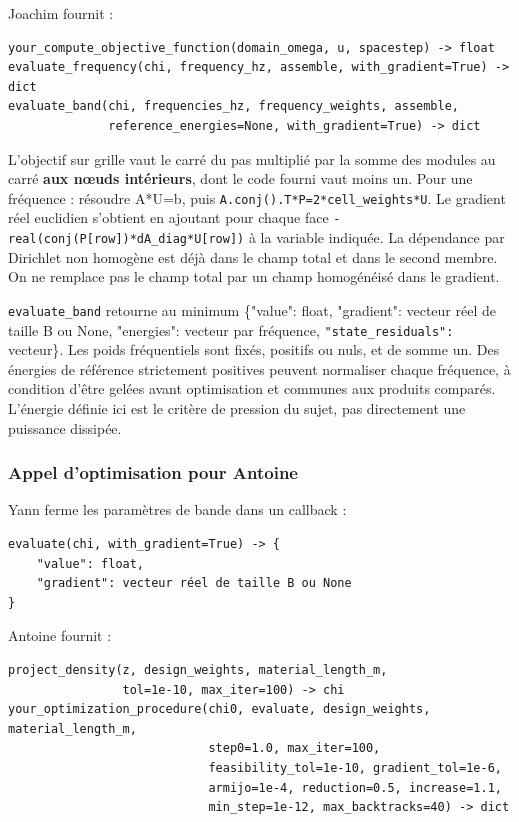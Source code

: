 \documentclass[11pt,a4paper]{article}
\begin{document}
Joachim fournit :

\begin{Verbatim}[breaklines,breakanywhere,fontsize=\footnotesize]
your_compute_objective_function(domain_omega, u, spacestep) -> float
evaluate_frequency(chi, frequency_hz, assemble, with_gradient=True) -> dict
evaluate_band(chi, frequencies_hz, frequency_weights, assemble,
              reference_energies=None, with_gradient=True) -> dict
\end{Verbatim}

L'objectif sur grille vaut le carré du pas multiplié par la somme des modules au carré \textbf{aux nœuds intérieurs}, dont le code fourni vaut moins un. Pour une fréquence : résoudre {\small\ttfamily A*U=b}, puis {\small\ttfamily \nolinkurl{A.conj().T*P=2*cell_weights*U}}. Le gradient réel euclidien s'obtient en ajoutant pour chaque face {\small\ttfamily \nolinkurl{-real(conj(P[row])*dA_diag*U[row])}} à la variable indiquée. La dépendance par Dirichlet non homogène est déjà dans le champ total et dans le second membre. On ne remplace pas le champ total par un champ homogénéisé dans le gradient.

{\small\ttfamily \nolinkurl{evaluate_band}} retourne au minimum {\small\ttfamily \{"value": float, "gradient": vecteur réel de taille B ou None, "energies": vecteur par fréquence, \nolinkurl{"state_residuals":} vecteur\}}. Les poids fréquentiels sont fixés, positifs ou nuls, et de somme un. Des énergies de référence strictement positives peuvent normaliser chaque fréquence, à condition d'être gelées avant optimisation et communes aux produits comparés. L'énergie définie ici est le critère de pression du sujet, pas directement une puissance dissipée.

\subsubsection{Appel d'optimisation pour Antoine}

Yann ferme les paramètres de bande dans un callback :

\begin{Verbatim}[breaklines,breakanywhere,fontsize=\footnotesize]
evaluate(chi, with_gradient=True) -> {
    "value": float,
    "gradient": vecteur réel de taille B ou None
}
\end{Verbatim}

Antoine fournit :

\begin{Verbatim}[breaklines,breakanywhere,fontsize=\footnotesize]
project_density(z, design_weights, material_length_m,
                tol=1e-10, max_iter=100) -> chi
your_optimization_procedure(chi0, evaluate, design_weights, material_length_m,
                            step0=1.0, max_iter=100,
                            feasibility_tol=1e-10, gradient_tol=1e-6,
                            armijo=1e-4, reduction=0.5, increase=1.1,
                            min_step=1e-12, max_backtracks=40) -> dict
\end{Verbatim}
\end{document}
